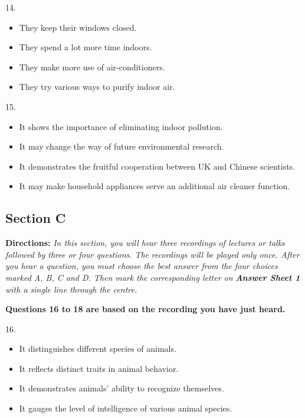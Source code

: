 \documentclass[UTF8,11pt]{ctexart}
\begin{document}
14.


\begin{itemize}[leftmargin=2em,itemsep=.2em,topsep=.4em]\item[A.] They keep their windows closed.
\item[B.] They spend a lot more time indoors.
\item[C.] They make more use of air-conditioners.
\item[D.] They try various ways to purify indoor air.
\end{itemize}

15.


\begin{itemize}[leftmargin=2em,itemsep=.2em,topsep=.4em]\item[A.] It shows the importance of eliminating indoor pollution.
\item[B.] It may change the way of future environmental research.
\item[C.] It demonstrates the fruitful cooperation between UK and Chinese scientists.
\item[D.] It may make household appliances serve an additional air cleaner function.
\end{itemize}

\subsection*{\textbf{Section C}}


\textbf{Directions:}\textit{ In this section, you will hear three recordings of lectures or talks followed by three or four questions. The} \textit{recordings will be played only once. After you hear a question, you must choose the best answer from the four choices} \textit{marked A, B, C and D. Then mark the corresponding letter on }\textbf{\textit{Answer Sheet 1}}\textit{ with a single line through the centre.}


\textbf{Questions 16 to 18 are based on the recording you have just heard.}


16.


\begin{itemize}[leftmargin=2em,itemsep=.2em,topsep=.4em]\item[A.] It distinguishes different species of animals.
\item[B.] It reflects distinct traits in animal behavior.
\item[C.] It demonstrates animals’ ability to recognize themselves.
\item[D.] It gauges the level of intelligence of various animal species.
\end{itemize}
\end{document}
